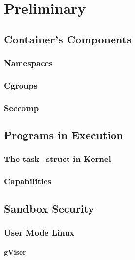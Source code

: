 \section{Preliminary}

\subsection{Container's Components}
\subsubsection{Namespaces}
\subsubsection{Cgroups}
\subsubsection{Seccomp}

\subsection{Programs in Execution}
\subsubsection{The task\_struct in Kernel}
\subsubsection{Capabilities}
\label{Capabilities}

\subsection{Sandbox Security}
\subsubsection{User Mode Linux}


\paragraph{gVisor}


